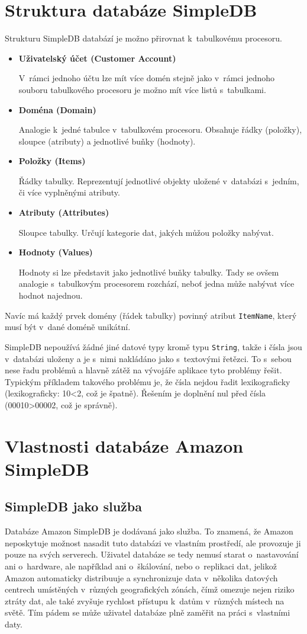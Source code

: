 \documentclass[oneside,12pt]{fithesis2}
\begin{document}
\section{Struktura databáze SimpleDB}\label{simpleDBArchitecture}
Strukturu SimpleDB databází je možno přirovnat k~tabulkovému procesoru.
\begin{itemize}
 \item \textbf{Uživatelský účet (Customer Account)}
 
 V~rámci jednoho účtu lze mít více domén stejně jako v~rámci jednoho souboru tabulkového procesoru je možno mít více listů s~tabulkami.
 \item \textbf{Doména (Domain)}
 
 Analogie k~jedné tabulce v~tabulkovém procesoru. Obsahuje řádky (položky), sloupce (atributy) a jednotlivé buňky (hodnoty).
 \item \textbf{Položky (Items)}
 
 Řádky tabulky. Reprezentují jednotlivé objekty uložené v~databázi s~jedním, či více vyplněnými atributy.
 \item \textbf{Atributy (Attributes)}
 
 Sloupce tabulky. Určují kategorie dat, jakých můžou položky nabývat.
 
 \item \textbf{Hodnoty (Values)}
 
 Hodnoty si lze představit jako jednotlivé buňky tabulky. Tady se ovšem analogie s~tabulkovým procesorem rozchází, neboť jedna  může nabývat více hodnot najednou.
 
\end{itemize}
Navíc má každý prvek domény (řádek tabulky) povinný atribut \verb<ItemName<, který musí být v~dané doméně unikátní.

SimpleDB nepoužívá žádné jiné datové typy kromě typu \verb<String<, takže i čísla jsou v~databázi uloženy a je s~nimi nakládáno jako s~textovými řetězci. To s~sebou nese řadu problémů a hlavně zátěž na vývojáře aplikace tyto problémy řešit. Typickým příkladem takového problému je, že čísla nejdou řadit lexikograficky (lexikograficky: 10<2, což je špatně). Řešením je doplnění nul před čísla (00010>00002, což je správně).

\section{Vlastnosti databáze Amazon SimpleDB}
\subsection{SimpleDB jako služba}
Databáze Amazon SimpleDB je dodávaná jako služba. To znamená, že Amazon neposkytuje možnost nasadit tuto databázi ve vlastním prostředí, ale provozuje ji pouze na svých serverech. Uživatel databáze se tedy nemusí starat o~nastavování ani o~hardware, ale například ani o~škálování, nebo o~replikaci dat, jelikož Amazon automaticky distribuuje a synchronizuje data v~několika datových centrech umístěných v~různých geografických zónách, čímž omezuje nejen riziko ztráty dat, ale také zvyšuje rychlost přístupu k~datům v~různých místech na světě. Tím pádem se může uživatel databáze plně zaměřit na práci s~vlastními daty.
\end{document}
